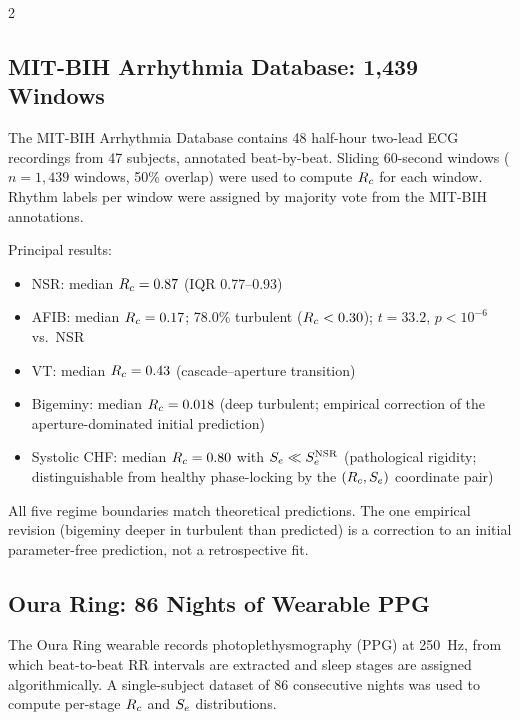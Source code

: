 \begin{multicols}{2}

\subsection{MIT-BIH Arrhythmia Database: 1{,}439 Windows}

The MIT-BIH Arrhythmia Database \citep{moody2001impact,goldberger2000physiobank}
contains 48 half-hour two-lead ECG recordings from 47 subjects,
annotated beat-by-beat. Sliding 60-second windows ($n = 1{,}439$
windows, 50\% overlap) were used to compute $R_c$ for each window.
Rhythm labels per window were assigned by majority vote from the
MIT-BIH annotations.

Principal results:
\begin{itemize}\setlength\itemsep{1pt}
\item NSR: median $R_c = 0.87$ (IQR 0.77--0.93)
\item AFIB: median $R_c = 0.17$; 78.0\% turbulent ($R_c < 0.30$);
  $t = 33.2$, $p < 10^{-6}$ vs.\ NSR
\item VT: median $R_c = 0.43$ (cascade--aperture transition)
\item Bigeminy: median $R_c = 0.018$ (deep turbulent;
  empirical correction of the aperture-dominated initial prediction)
\item Systolic CHF: median $R_c = 0.80$ with $S_e \ll S_e^{\mathrm{NSR}}$
  (pathological rigidity; distinguishable from healthy phase-locking
  by the $(R_c, S_e)$ coordinate pair)
\end{itemize}

All five regime boundaries match theoretical predictions. The one
empirical revision (bigeminy deeper in turbulent than predicted)
is a correction to an initial parameter-free prediction, not a
retrospective fit.

\columnbreak

\subsection{Oura Ring: 86 Nights of Wearable PPG}

The Oura Ring wearable
\citep{altini2021promise,derosario2019validity} records
photoplethysmography (PPG) at 250~Hz, from which beat-to-beat RR
intervals are extracted and sleep stages are assigned
algorithmically. A single-subject dataset of 86 consecutive nights
was used to compute per-stage $R_c$ and $S_e$ distributions.


\end{multicols}
